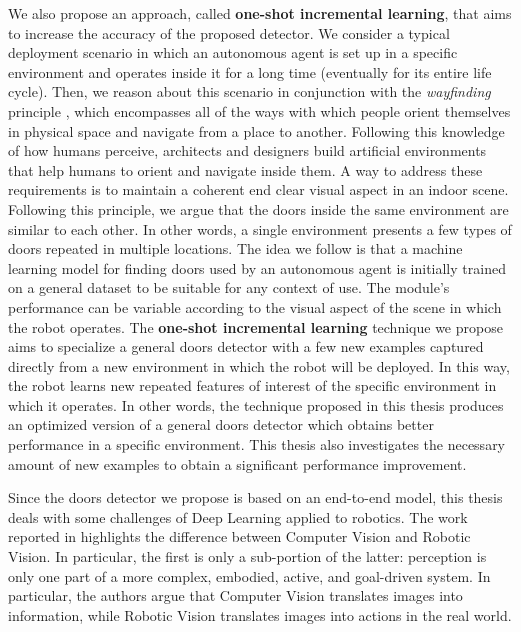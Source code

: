 We also propose an approach, called \textbf{one-shot incremental learning}, that aims to increase the accuracy of the proposed detector. We consider a typical deployment scenario in which an autonomous agent is set up in a specific environment and operates inside it for a long time (eventually for its entire life cycle). Then, we reason about this scenario in  conjunction with the \textit{wayfinding} principle \cite{wayfinding, imageofcity}, which encompasses all of the ways with which people orient themselves in physical space and navigate from a place to another. Following this knowledge of how humans perceive, architects and designers build artificial environments that help humans to orient and navigate inside them. A way to address these requirements is to maintain a coherent end clear visual aspect in an indoor scene. Following this principle, we argue that the doors inside the same environment are similar to each other. In other words, a single environment presents a few types of doors repeated in multiple locations. The idea we follow is that a machine learning model for finding doors used by an autonomous agent is initially trained on a general dataset to be suitable for any context of use. The module's performance can be variable according to the visual aspect of the scene in which the robot operates. The \textbf{one-shot incremental learning} technique we propose aims to specialize a general doors detector with a few new examples captured directly from a new environment in which the robot will be deployed. In this way, the robot learns new  repeated features of interest of the specific environment in which it operates. 
 In other words, the technique proposed in this thesis produces an optimized version of a general doors detector which obtains better performance in a specific environment. This thesis also investigates the necessary amount of new examples to obtain a significant performance improvement.

Since the doors detector we propose is based on an end-to-end model, this thesis deals with some challenges of Deep Learning applied to robotics. The work reported in \cite{surveydeeplimits} highlights the difference between Computer Vision and Robotic Vision. In particular, the first is only a sub-portion of the latter: perception is only one part of a more complex, embodied, active, and goal-driven system. In particular, the authors argue that Computer Vision translates images into information, while Robotic Vision translates images into actions in the real world.

